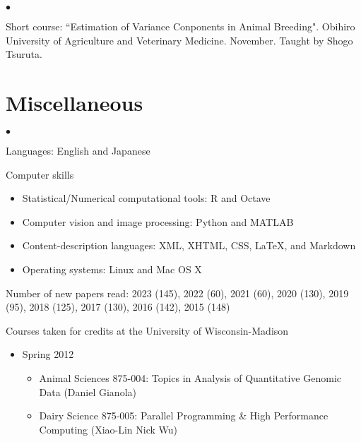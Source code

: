 \documentclass[margin,line,10pt]{res}
\newenvironment{list2}{
  \begin{list}{$\bullet$}{%
      \setlength{\itemsep}{0in}
      \setlength{\parsep}{0in} \setlength{\parskip}{0in}
      \setlength{\topsep}{0in} \setlength{\partopsep}{0in} 
      \setlength{\leftmargin}{0.2in}}}{\end{list}}
\begin{document}
\begin{resume}
\section{}
\begin{list2}
\item Short course: ``Estimation of Variance Conponents in Animal Breeding". Obihiro University of Agriculture and Veterinary Medicine. November. 
Taught by Shogo Tsuruta.  
\end{list2}  



\vspace{0.5cm}
\section{\sc Miscellaneous} 
\begin{list2}

\item Languages: English and Japanese
  \vspace{0.3cm}

\item Computer skills 
  \begin{itemize}
  \item Statistical/Numerical computational tools: R and Octave
  \item Computer vision and image processing: Python and MATLAB
  \item Content-description languages: XML, XHTML, CSS, \LaTeX, and Markdown
  \item Operating systems: Linux and Mac OS X
  \end{itemize}


  \vspace{0.3cm}
\item Number of new papers read: 2023 (145), 2022 (60), 2021 (60), 2020 (130), 2019 (95), 2018 (125), 2017 (130), 2016 (142), 2015 (148)


  \vspace{0.3cm}
\item Courses taken for credits at the University of Wisconsin-Madison 
  \begin{itemize}

\item Spring 2012
\begin{itemize}
\item    Animal Sciences 875-004: Topics in Analysis of Quantitative Genomic Data (Daniel Gianola)
\item    Dairy Science 875-005: Parallel Programming \& High Performance Computing (Xiao-Lin Nick Wu)
\end{itemize}



\end{itemize}
\end{list2}
\end{resume}
\end{document}
